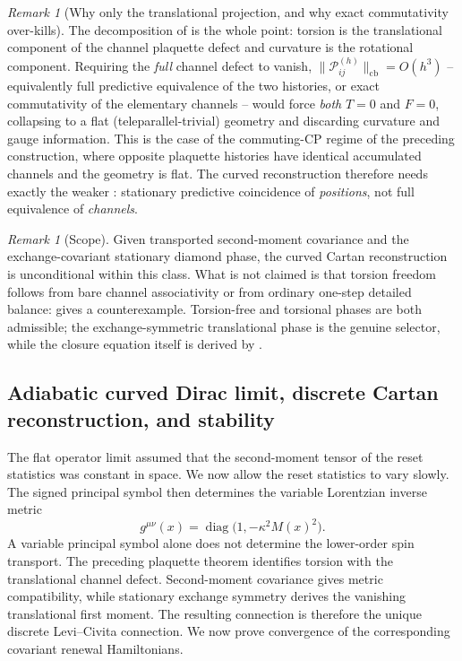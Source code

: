\documentclass[11pt]{article}
\theoremstyle{definition}
\theoremstyle{remark}
\newtheorem{remark}[theorem]{Remark}
\newcommand{\cb}{\mathrm{cb}}
\newcommand{\diag}{\operatorname{diag}}
\newcommand{\Pcal}{\mathscr{P}}
\newcommand{\Fcal}{F}
\begin{document}
\begin{remark}[Why only the translational projection, and why exact commutativity over-kills]
\label{rem:trans-only}
The decomposition of  is the whole point:
torsion is the translational component of the channel plaquette defect and
curvature is the rotational component.  Requiring the \emph{full} channel defect
to vanish, $\|\Pcal_{ij}^{(h)}\|_{\cb}=O(h^3)$ -- equivalently full predictive
equivalence of the two histories, or exact commutativity of the elementary
channels -- would force \emph{both} $T=0$ and $\Fcal=0$, collapsing to a flat
(teleparallel-trivial) geometry and discarding curvature and gauge information.
This is the case of the commuting-CP regime of the preceding construction, where opposite
plaquette histories have identical accumulated channels and the geometry is flat.
The curved reconstruction therefore needs exactly the weaker
: stationary predictive coincidence of
\emph{positions}, not full equivalence of \emph{channels}.
\end{remark}

\begin{remark}[Scope]
\label{rem:cxii-status}
Given transported second-moment covariance and the exchange-covariant
stationary diamond phase, the curved Cartan reconstruction is unconditional
within this class.  What is not claimed is that torsion freedom follows from
bare channel associativity or from ordinary one-step detailed balance:
 gives a counterexample.  Torsion-free
and torsional phases are both admissible; the exchange-symmetric translational
phase is the genuine selector, while the closure equation itself is derived by
.
\end{remark}

\subsection{Adiabatic curved Dirac limit, discrete Cartan reconstruction, and stability}
\label{sec:curved-stability}

The flat operator limit assumed that the second-moment tensor of the reset
statistics was constant in space.  We now allow the reset statistics to vary
slowly.  The signed principal symbol then determines the variable Lorentzian
inverse metric
\[
  g^{\mu\nu}(x)=\diag\bigl(1,-\kappa^2M(x)^2\bigr).
\]
A variable principal symbol alone does not determine the lower-order spin
transport.  The preceding plaquette theorem identifies torsion with the
translational channel defect.  Second-moment covariance gives metric
compatibility, while stationary exchange symmetry derives the vanishing
translational first moment.  The resulting connection is therefore the unique
discrete Levi--Civita connection.  We now prove convergence of the corresponding
covariant renewal Hamiltonians.
\end{document}
